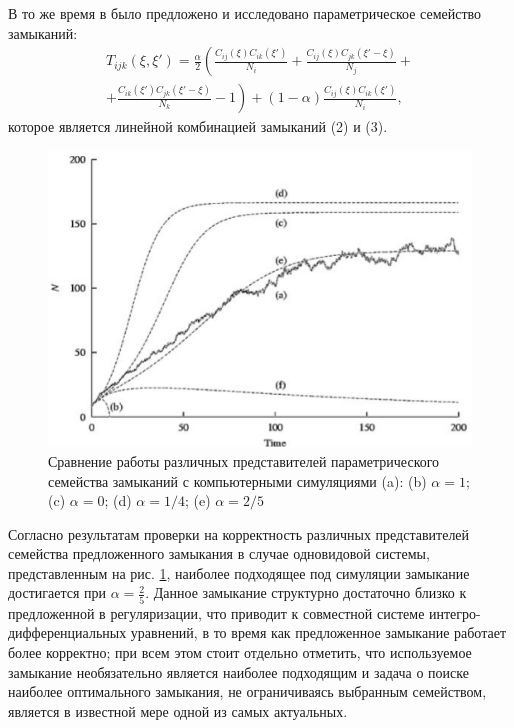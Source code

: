 В то же время в \cite{murlaw} было предложено и исследовано параметрическое семейство замыканий:
\begin{multline}\label{eq:closure}
T_{ijk}(\xi,\xi')	=	\frac{\alpha}{2}\left(\frac{C_{ij}(\xi)C_{ik}(\xi')}{N_{i}}+\frac{C_{ij}(\xi)C_{jk}(\xi'-\xi)}{N_{j}}+\right.\\ 
\left.+\frac{C_{ik}(\xi')C_{jk}(\xi'-\xi)}{N_{k}}-1\right)+(1-\alpha)\frac{C_{ij}(\xi)C_{ik}(\xi')}{N_{i}},
\end{multline}
которое является линейной комбинацией замыканий (2) и (3). 
\begin{figure}[ht]
	\centering
		\includegraphics[width=.75\linewidth]{closures.eps}
		\caption{Сравнение работы различных представителей параметрического семейства замыканий с компьютерными симуляциями (a): (b) $\alpha = 1$; (c) $\alpha =0$; (d) $\alpha=1/4$; (e) $\alpha=2/5$}
	\label{fig:comp2}
\end{figure}

Согласно результатам проверки на корректность различных представителей семейства предложенного замыкания в случае одновидовой системы, представленным на рис. \ref{fig:comp2}, наиболее подходящее под симуляции замыкание достигается при $\alpha = \frac{2}{5} $. Данное замыкание структурно достаточно близко к предложенной в \cite{as2} регуляризации, что приводит к совместной системе интегро-дифференциальных уравнений, в то время как предложенное замыкание работает более корректно; при всем этом стоит отдельно отметить, что используемое замыкание необязательно является наиболее подходящим и задача о поиске наиболее оптимального замыкания, не ограничиваясь выбранным семейством, является в известной мере одной из самых актуальных.